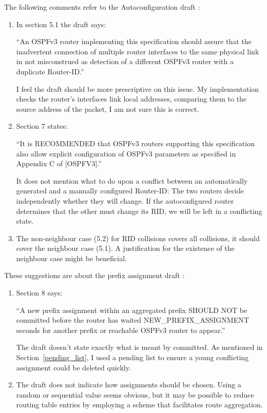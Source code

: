\documentclass[12pt,a4paper,twoside]{report}
\begin{document}
The following comments refer to the Autoconfiguration draft
\cite{draft-ietf-ospf-ospfv3-autoconfig-02}:
\begin{enumerate}
	\item In section 5.1 the draft says: 

		``An OSPFv3 router implementing this specification should assure that the
		inadvertent connection of multiple router interfaces to the same physical
		link in not misconstrued as detection of a different OSPFv3 router with a
		duplicate Router-ID.'' 

		 I feel the draft should be more prescriptive on this issue.  My
		 implementation checks the router's interfaces link local addresses,
		 comparing them to the source address of the packet, I am not sure this is
		 correct.
	\item Section 7 states:

		``It is RECOMMENDED that OSPFv3 routers supporting this specification
		also allow explicit configuration of OSPFv3 parameters as specified
		in Appendix C of [OSPFV3].''

		It does not mention what to do upon a conflict between an automatically
		generated and a manually configured Router-ID: The two routers decide
		independently whether they will change. If the autoconfigured router
		determines that the other must change its RID, we will be left in a
		conflicting state.
	\item  The non-neighbour case (5.2) for RID collisions covers all collisions,
		it should cover the neighbour case (5.1). A justification for the existence
		of the neighbour case might be beneficial.
\end{enumerate}

These suggestions are about the prefix assignment draft
\cite{draft-arkko-homenet-prefix-assignment-03}:
\begin{enumerate}
	\item Section 8 says:

		``A new prefix assignment within an aggregated prefix SHOULD NOT be
		committed before the router has waited NEW\_PREFIX\_ASSIGNMENT seconds for
		another prefix or reachable OSPFv3 router to appear.''

		The draft doesn't state exactly what is meant by committed. As mentioned in
		Section~\ref{pending_list}, I used a pending list to ensure a young
		conflicting assignment could be deleted quickly.
	\item The draft does not indicate how assignments should be chosen. Using a
		random or sequential value seems obvious, but it may be possible to reduce
		routing table entries by employing a scheme that facilitates route
		aggregation. 
\end{enumerate}
\end{document}
